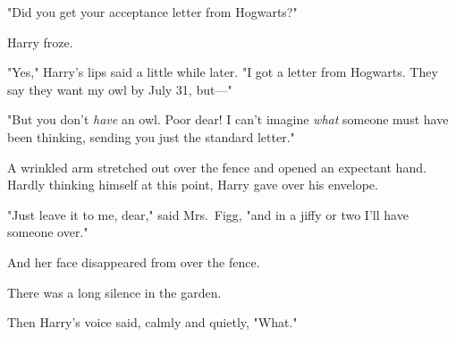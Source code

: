 "Did you get your acceptance letter from Hogwarts?"

Harry froze.

"Yes," Harry's lips said a little while later. "I got a letter
from Hogwarts. They say they want my owl by July 31, but—"

"But you don't \emph{have} an owl. Poor dear! I can't imagine
\emph{what} someone must have been thinking, sending you just
the standard letter."

A wrinkled arm stretched out over the fence and opened
an expectant hand. Hardly thinking himself at this point,
Harry gave over his envelope.

"Just leave it to me, dear," said Mrs.~Figg, "and in a jiffy
or two I'll have someone over."

And her face disappeared from over the fence.

There was a long silence in the garden.

Then Harry's voice said, calmly and quietly, "What."
